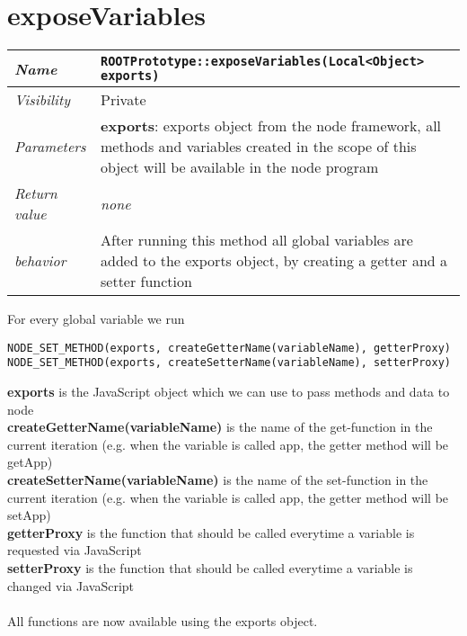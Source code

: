 \section{exposeVariables}
\begin{longtable}{p{3cm} @{\hskip 1cm} p{12cm}}
  \hline
  \textit{Name} & \texttt{ROOTPrototype::exposeVariables(Local<Object> exports)} \\
  \hline
  \textit{Visibility} & Private \\
  \hline
  \textit{Parameters} & \textbf{exports}: exports object from the node framework, all methods and variables created in the scope of this object will be available in the node program \\
  \hline
  \textit{Return value} & \textit{none} \\
  \hline
  \textit{behavior} & After running this method all global variables are added to the exports object, by creating a getter and a setter function \\
  \hline
\end{longtable}

For every global variable we run
\begin{verbatim}
NODE_SET_METHOD(exports, createGetterName(variableName), getterProxy)
NODE_SET_METHOD(exports, createSetterName(variableName), setterProxy)
\end{verbatim}

\textbf{exports} is the JavaScript object which we can use to pass methods and data to node \\
\textbf{createGetterName(variableName)} is the name of the get-function in the current iteration (e.g. when the variable is called app, the getter method will be getApp)\\
\textbf{createSetterName(variableName)} is the name of the set-function in the current iteration (e.g. when the variable is called app, the getter method will be setApp)\\
\textbf{getterProxy} is the function that should be called everytime a variable is requested via JavaScript\\
\textbf{setterProxy} is the function that should be called everytime a variable is changed via JavaScript\\
\\
All functions are now available using the exports object.
\newpage

